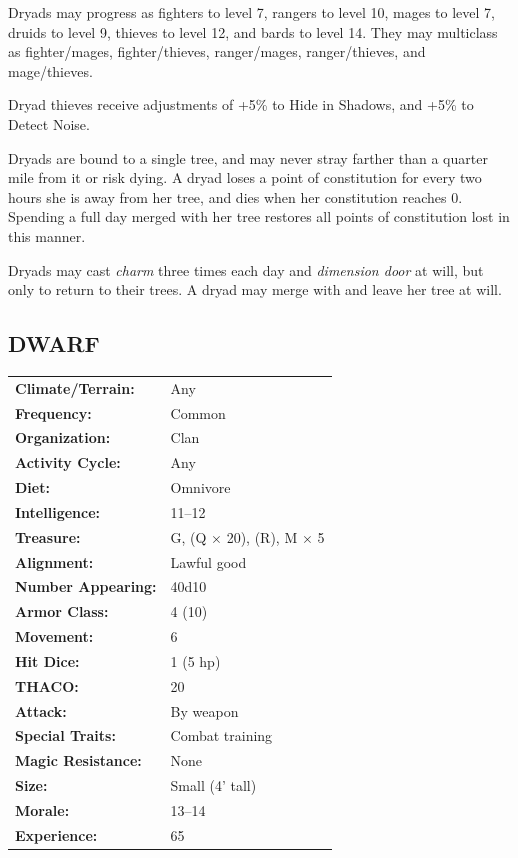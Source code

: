 \begin{multicols}{2}
\begin{minipage}{\columnwidth}
\end{minipage}

Dryads may progress as fighters to level 7, rangers to level 10, mages to level 7, druids to level 9, thieves to level 12, and bards to level 14. They may multiclass as fighter/mages, fighter/thieves, ranger/mages, ranger/thieves, and mage/thieves.

Dryad thieves receive adjustments of +5\% to Hide in Shadows, and +5\% to Detect Noise.

Dryads are bound to a single tree, and may never stray farther than a quarter mile from it or risk dying. A dryad loses a point of constitution for every two hours she is away from her tree, and dies when her constitution reaches 0. Spending a full day merged with her tree restores all points of constitution lost in this manner.

Dryads may cast \textit{charm} three times each day and \textit{dimension door} at will, but only to return to their trees. A dryad may merge with and leave her tree at will.

\noindent \begin{minipage}{\columnwidth}

\vspace{1em}

\subsection{DWARF}

\noindent \begin{tabular}{p{}p{}}
\textbf{Climate/Terrain:}	& Any \\
\textbf{Frequency:} 		& Common \\
\textbf{Organization:} 		& Clan \\
\textbf{Activity Cycle:} 	& Any \\
\textbf{Diet:} 				& Omnivore \\
\textbf{Intelligence:} 		& 11--12 \\
\textbf{Treasure:} 			& G, (Q $\times$ 20), (R), M $\times$ 5 \\
\textbf{Alignment:} 		& Lawful good \\
\hline
\textbf{Number Appearing:} 	& 40d10 \\
\textbf{Armor Class:} 		& 4 (10) \\
\textbf{Movement:} 			& 6 \\
\textbf{Hit Dice:} 			& 1 (5 hp) \\
\textbf{THACO:} 			& 20 \\
\textbf{Attack:} 			& By weapon \\
\textbf{Special Traits:} 	& Combat training \\
\textbf{Magic Resistance:} 	& None \\
\textbf{Size:} 				& Small (4' tall)\\
\textbf{Morale:} 			& 13--14 \\
\textbf{Experience:} 		& 65 \\ %
\end{tabular}


\end{minipage}
\end{multicols}
